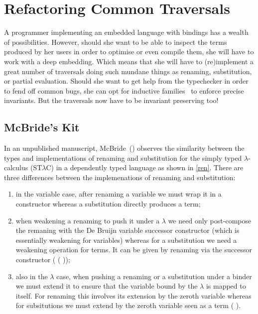 \chapter{Refactoring Common Traversals}

A programmer implementing an embedded language with bindings has a
wealth of possibilities. However, should she want to be able to inspect
the terms produced by her users in order to optimise or even compile
them, she will have to work with a deep embedding. Which means that she
will have to (re)implement a great number of traversals doing such
mundane things as renaming, substitution, or partial evaluation.
Should she want to get help from the typechecker in order to fend
off common bugs, she can opt for inductive families~\cite{dybjer1991inductive}
to enforce precise invariants. But the traversals now have to be
invariant preserving too!

\section{McBride's Kit}

In an unpublished manuscript, McBride~(\citeyear{mcbride2005type})
observes the similarity between the types and implementations of
renaming and substitution for the simply typed $λ$-calculus (ST$λ$C) in a
dependently typed language as shown in \cref{ren}. There are three
differences between the implemenations of renaming and substitution:
\begin{enumerate}
  \item
    in the variable case, after renaming a variable we must wrap it
    in a  constructor whereas a substitution directly
    produces a term;
  \item
    when weakening a renaming to push it under a $λ$ we need only
    post-compose the remaning with the De Bruijn variable successor
    constructor  (which is essentially weakening for variables)
    whereas for a substitution we need a weakening operation for terms.
    It can be given by renaming via the successor constructor
    ( ( ));
  \item
    also in the $λ$ case, when pushing a renaming or a substitution under
    a binder we must extend it to ensure that the variable bound by the
    $λ$ is mapped to itself. For renaming this involves its extension by
    the zeroth variable  whereas for subsitutions we must extend by
    the zeroth variable seen as a term ( ).
\end{enumerate}

